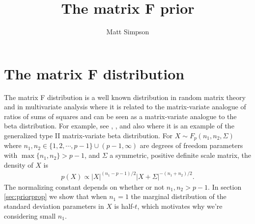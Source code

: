 \documentclass{article}\usepackage[]{graphicx}\usepackage[]{color}
\begin{document}
\title{The matrix F prior}
\author{Matt Simpson}
\maketitle

\section{The matrix F distribution}

The matrix F distribution is a well known distribution in random matrix theory and in multivariate analysis where it is related to the matrix-variate analogue of ratios of sums of squares and can be seen as a matrix-variate analogue to the beta distribution. For example, see \cite{dawid1981some}, \cite{fang1990generalized}, and also \cite{gupta1999matrix} where it is an example of the generalized type II matrix-variate beta distribution. For $X\sim F_p(n_1, n_2, \Sigma)$ where $n_1, n_2 \in \{1,2,\cdots,p-1\}\cup (p-1,\infty)$ are degrees of freedom parameters with $\max\{n_1,n_2\}>p-1$, and $\Sigma$ a symmetric, positive definite scale matrix, the density of $X$ is
\begin{align}\label{Fdens}
  p(X) \propto |X|^{(n_1 - p - 1)/2}|X + \Sigma|^{-(n_1 + n_2)/2}.
\end{align}
The normalizing constant depends on whether or not $n_1,n_2 > p - 1$. In section \ref{sec:priorprop} we show that when $n_1=1$ the marginal distribution of the standard deviation parameters in $X$ is half-$t$, which motivates why we're considering small $n_1$.
\end{document}
